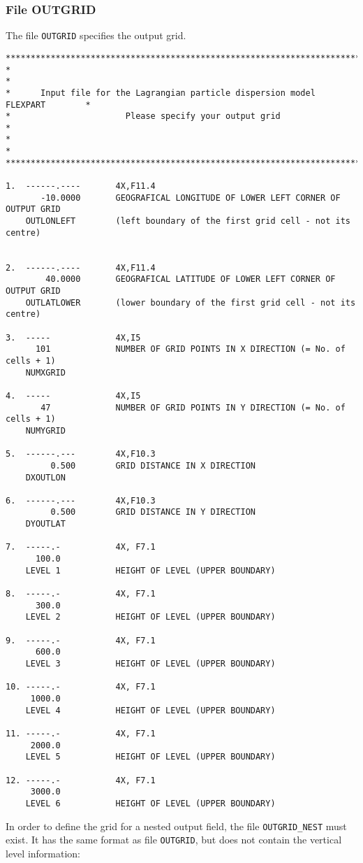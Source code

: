 \documentclass{egu}                  %
\begin{document}
\subsubsection{File OUTGRID}
The file \verb|OUTGRID| specifies the output grid.
\begin{scriptsize}\begin{verbatim}
********************************************************************************
*                                                                              *
*      Input file for the Lagrangian particle dispersion model FLEXPART        *
*                       Please specify your output grid                        *
*                                                                              *
********************************************************************************

1.  ------.----       4X,F11.4
       -10.0000       GEOGRAFICAL LONGITUDE OF LOWER LEFT CORNER OF OUTPUT GRID
    OUTLONLEFT        (left boundary of the first grid cell - not its centre)


2.  ------.----       4X,F11.4
        40.0000       GEOGRAFICAL LATITUDE OF LOWER LEFT CORNER OF OUTPUT GRID
    OUTLATLOWER       (lower boundary of the first grid cell - not its centre)

3.  -----             4X,I5
      101             NUMBER OF GRID POINTS IN X DIRECTION (= No. of cells + 1)
    NUMXGRID

4.  -----             4X,I5
       47             NUMBER OF GRID POINTS IN Y DIRECTION (= No. of cells + 1)
    NUMYGRID

5.  ------.---        4X,F10.3
         0.500        GRID DISTANCE IN X DIRECTION
    DXOUTLON

6.  ------.---        4X,F10.3
         0.500        GRID DISTANCE IN Y DIRECTION
    DYOUTLAT

7.  -----.-           4X, F7.1
      100.0
    LEVEL 1           HEIGHT OF LEVEL (UPPER BOUNDARY)

8.  -----.-           4X, F7.1
      300.0
    LEVEL 2           HEIGHT OF LEVEL (UPPER BOUNDARY)

9.  -----.-           4X, F7.1
      600.0
    LEVEL 3           HEIGHT OF LEVEL (UPPER BOUNDARY)

10. -----.-           4X, F7.1
     1000.0
    LEVEL 4           HEIGHT OF LEVEL (UPPER BOUNDARY)

11. -----.-           4X, F7.1
     2000.0
    LEVEL 5           HEIGHT OF LEVEL (UPPER BOUNDARY)

12. -----.-           4X, F7.1
     3000.0
    LEVEL 6           HEIGHT OF LEVEL (UPPER BOUNDARY)
\end{verbatim}\end{scriptsize}
In order to define the grid for a nested output field, the file
\verb|OUTGRID_NEST| must exist.  It has the same format as file \verb|OUTGRID|,
but does not contain the vertical level information:
\end{document}
